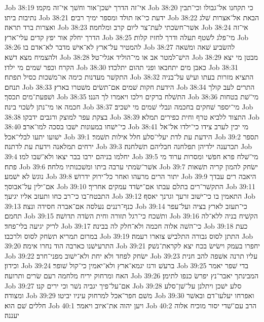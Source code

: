 Job 38:19  אי־זה הדרך ישׁכן־אור וחשׁך אי־זה מקמו׃
Job 38:20  כי תקחנו אל־גבולו וכי־תבין נתיבות ביתו׃
Job 38:21  ידעת כי־אז תולד ומספר ימיך רבים׃
Job 38:22  הבאת אל־אצרות שׁלג ואצרות ברד תראה׃
Job 38:23  אשׁר־חשׂכתי לעת־צר ליום קרב ומלחמה׃
Job 38:24  אי־זה הדרך יחלק אור יפץ קדים עלי־ארץ׃
Job 38:25  מי־פלג לשׁטף תעלה ודרך לחזיז קלות׃
Job 38:26  להמטיר על־ארץ לא־אישׁ מדבר לא־אדם בו׃
Job 38:27  להשׂביע שׁאה ומשׁאה ולהצמיח מצא דשׁא׃
Job 38:28  הישׁ־למטר אב או מי־הוליד אגלי־טל׃
Job 38:29  מבטן מי יצא הקרח וכפר שׁמים מי ילדו׃
Job 38:30  כאבן מים יתחבאו ופני תהום יתלכדו׃
Job 38:31  התקשׁר מעדנות כימה או־משׁכות כסיל תפתח׃
Job 38:32  התציא מזרות בעתו ועישׁ על־בניה תנחם׃
Job 38:33  הידעת חקות שׁמים אם־תשׂים משׁטרו בארץ׃
Job 38:34  התרים לעב קולך ושׁפעת־מים תכסך׃
Job 38:35  התשׁלח ברקים וילכו ויאמרו לך הננו׃
Job 38:36  מי־שׁת בטחות חכמה או מי־נתן לשׂכוי בינה׃
Job 38:37  מי־יספר שׁחקים בחכמה ונבלי שׁמים מי ישׁכיב׃
Job 38:38  בצקת עפר למוצק ורגבים ידבקו׃
Job 38:39  התצוד ללביא טרף וחית כפירים תמלא׃
Job 38:40  כי־ישׁחו במעונות ישׁבו בסכה למו־ארב׃
Job 38:41  מי יכין לערב צידו כי־ילדו אל־אל ישׁועו יתעו לבלי־אכל׃
Job 39:1  הידעת עת לדת יעלי־סלע חלל אילות תשׁמר׃
Job 39:2  תספר ירחים תמלאנה וידעת עת לדתנה׃
Job 39:3  תכרענה ילדיהן תפלחנה חבליהם תשׁלחנה׃
Job 39:4  יחלמו בניהם ירבו בבר יצאו ולא־שׁבו למו׃
Job 39:5  מי־שׁלח פרא חפשׁי ומסרות ערוד מי פתח׃
Job 39:6  אשׁר־שׂמתי ערבה ביתו ומשׁכנותיו מלחה׃
Job 39:7  ישׂחק להמון קריה תשׁאות נוגשׂ לא ישׁמע׃
Job 39:8  יתור הרים מרעהו ואחר כל־ירוק ידרושׁ׃
Job 39:9  היאבה רים עבדך אם־ילין על־אבוסך׃
Job 39:10  התקשׁר־רים בתלם עבתו אם־ישׂדד עמקים אחריך׃
Job 39:11  התבטח־בו כי־רב כחו ותעזב אליו יגיעך׃
Job 39:12  התאמין בו כי־ישׁוב זרעך וגרנך יאסף׃
Job 39:13  כנף־רננים נעלסה אם־אברה חסידה ונצה׃
Job 39:14  כי־תעזב לארץ בציה ועל־עפר תחמם׃
Job 39:15  ותשׁכח כי־רגל תזורה וחית השׂדה תדושׁה׃
Job 39:16  הקשׁיח בניה ללא־לה לריק יגיעה בלי־פחד׃
Job 39:17  כי־השׁה אלוה חכמה ולא־חלק לה בבינה׃
Job 39:18  כעת במרום תמריא תשׂחק לסוס ולרכבו׃
Job 39:19  התתן לסוס גבורה התלבישׁ צוארו רעמה׃
Job 39:20  התרעישׁנו כארבה הוד נחרו אימה׃
Job 39:21  יחפרו בעמק וישׂישׂ בכח יצא לקראת־נשׁק׃
Job 39:22  ישׂחק לפחד ולא יחת ולא־ישׁוב מפני־חרב׃
Job 39:23  עליו תרנה אשׁפה להב חנית וכידון׃
Job 39:24  ברעשׁ ורגז יגמא־ארץ ולא־יאמין כי־קול שׁופר׃
Job 39:25  בדי שׁפר יאמר האח ומרחוק יריח מלחמה רעם שׂרים ותרועה׃
Job 39:26  המבינתך יאבר־נץ יפרשׂ כנפו לתימן׃
Job 39:27  אם־על־פיך יגביה נשׁר וכי ירים קנו׃
Job 39:28  סלע ישׁכן ויתלנן על־שׁן־סלע ומצודה׃
Job 39:29  משׁם חפר־אכל למרחוק עיניו יביטו׃
Job 39:30  ואפרחו יעלעו־דם ובאשׁר חללים שׁם הוא׃
Job 40:1  ויען יהוה את־איוב ויאמר׃
Job 40:2  הרב עם־שׁדי יסור מוכיח אלוה יעננה׃

